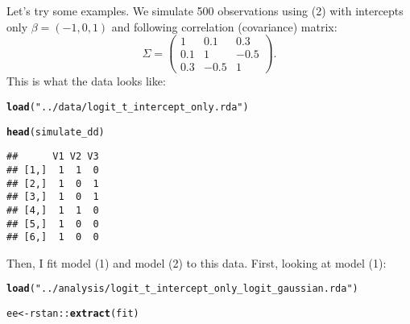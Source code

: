 \documentclass{article}\usepackage[]{graphicx}\usepackage[]{color}
\makeatletter
\newcommand{\hlstr}[1]{\textcolor[rgb]{0.192,0.494,0.8}{#1}}%
\newcommand{\hlopt}[1]{\textcolor[rgb]{0,0,0}{#1}}%
\newcommand{\hlstd}[1]{\textcolor[rgb]{0.345,0.345,0.345}{#1}}%
\newcommand{\hlkwb}[1]{\textcolor[rgb]{0.69,0.353,0.396}{#1}}%
\newcommand{\hlkwd}[1]{\textcolor[rgb]{0.737,0.353,0.396}{\textbf{#1}}}%
\newenvironment{kframe}{%
 \def\at@end@of@kframe{}%
 \ifinner\ifhmode%
  \def\at@end@of@kframe{\end{minipage}}%
  \begin{minipage}{\columnwidth}%
 \fi\fi%
 \def\FrameCommand##1{\hskip\@totalleftmargin \hskip-\fboxsep
 \colorbox{shadecolor}{##1}\hskip-\fboxsep
     \hskip-\linewidth \hskip-\@totalleftmargin \hskip\columnwidth}%
 \MakeFramed {\advance\hsize-\width
   \@totalleftmargin\z@ \linewidth\hsize
   \@setminipage}}%
 {\par\unskip\endMakeFramed%
 \at@end@of@kframe}
\newenvironment{knitrout}{}{} %
\makeatother
\begin{document}
Let's try some examples. We simulate 500 observations using (2) with intercepts only $\beta = (-1, 0, 1)$ and following correlation (covariance) matrix:
$$
\Sigma = \begin{pmatrix}
1 & 0.1 & 0.3\\
0.1 & 1 & -0.5\\
0.3 & -0.5 & 1
\end{pmatrix}.
$$
This is what the data looks like:
\begin{knitrout}
\color{fgcolor}\begin{kframe}
\begin{alltt}
\hlkwd{load}\hlstd{(}\hlstr{"../data/logit_t_intercept_only.rda"}\hlstd{)}

\hlkwd{head}\hlstd{(simulate_dd)}
\end{alltt}
\begin{verbatim}
##      V1 V2 V3
## [1,]  1  1  0
## [2,]  1  0  1
## [3,]  1  0  1
## [4,]  1  1  0
## [5,]  1  0  0
## [6,]  1  0  0
\end{verbatim}
\end{kframe}
\end{knitrout}

Then, I fit model (1) and model (2) to this data. First, looking at model (1):
\begin{knitrout}
\color{fgcolor}\begin{kframe}
\begin{alltt}
\hlkwd{load}\hlstd{(}\hlstr{"../analysis/logit_t_intercept_only_logit_gaussian.rda"}\hlstd{)}

\hlstd{ee} \hlkwb{<-} \hlstd{rstan}\hlopt{::}\hlkwd{extract}\hlstd{(fit)}
\end{alltt}
\end{kframe}
\end{knitrout}
\end{document}
